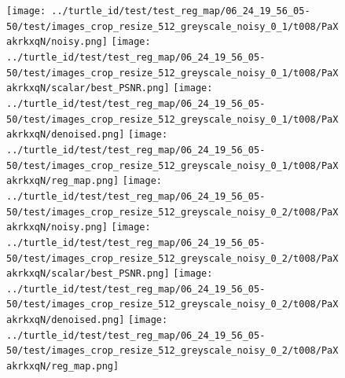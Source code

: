 \documentclass[12pt]{article}
\begin{document}
\begin{figure}[H]
    \centering

    \texttt{[image: ../turtle\_id/test/test\_reg\_map/06\_24\_19\_56\_05-50/test/images\_crop\_resize\_512\_greyscale\_noisy\_0\_1/t008/PaXakrkxqN/noisy.png]}
    \texttt{[image: ../turtle\_id/test/test\_reg\_map/06\_24\_19\_56\_05-50/test/images\_crop\_resize\_512\_greyscale\_noisy\_0\_1/t008/PaXakrkxqN/scalar/best\_PSNR.png]}
    \texttt{[image: ../turtle\_id/test/test\_reg\_map/06\_24\_19\_56\_05-50/test/images\_crop\_resize\_512\_greyscale\_noisy\_0\_1/t008/PaXakrkxqN/denoised.png]}
    \texttt{[image: ../turtle\_id/test/test\_reg\_map/06\_24\_19\_56\_05-50/test/images\_crop\_resize\_512\_greyscale\_noisy\_0\_1/t008/PaXakrkxqN/reg\_map.png]}
    \texttt{[image: ../turtle\_id/test/test\_reg\_map/06\_24\_19\_56\_05-50/test/images\_crop\_resize\_512\_greyscale\_noisy\_0\_2/t008/PaXakrkxqN/noisy.png]}
    \texttt{[image: ../turtle\_id/test/test\_reg\_map/06\_24\_19\_56\_05-50/test/images\_crop\_resize\_512\_greyscale\_noisy\_0\_2/t008/PaXakrkxqN/scalar/best\_PSNR.png]}
    \texttt{[image: ../turtle\_id/test/test\_reg\_map/06\_24\_19\_56\_05-50/test/images\_crop\_resize\_512\_greyscale\_noisy\_0\_2/t008/PaXakrkxqN/denoised.png]}
    \texttt{[image: ../turtle\_id/test/test\_reg\_map/06\_24\_19\_56\_05-50/test/images\_crop\_resize\_512\_greyscale\_noisy\_0\_2/t008/PaXakrkxqN/reg\_map.png]}

\end{figure}
\end{document}
